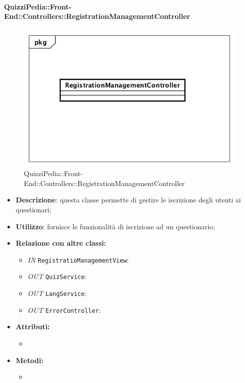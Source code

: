 \paragraph{QuizziPedia::Front-End::Controllers::RegistrationManagementController}
\begin{figure}
	\centering
	\includegraphics[scale=0.45]{UML/Classi/Front-End/QuizziPedia_Front-end_Controller_RegistrationManagementController.png}
	\caption{QuizziPedia::Front-End::Controllers::RegistrationManagementController}
\end{figure}
\begin{itemize}
	\item \textbf{Descrizione}: questa classe permette di gestire le iscrizione degli utenti ai questionari;
	\item \textbf{Utilizzo}: fornisce le funzionalità di iscrizione ad un questionario;
	\item \textbf{Relazione con altre classi:}
	\begin{itemize}
		\item \textit{IN} \texttt{RegistratioManagementView}: 
		\item \textit{OUT} \texttt{QuizService}: 
		\item \textit{OUT} \texttt{LangService}: 
		\item \textit{OUT} \texttt{ErrorController}: 
	\end{itemize}
	\item \textbf{Attributi:}
	\begin{itemize}
		\item 
	\end{itemize}
	\item \textbf{Metodi:}
	\begin{itemize}
		\item 
	\end{itemize}
\end{itemize}

